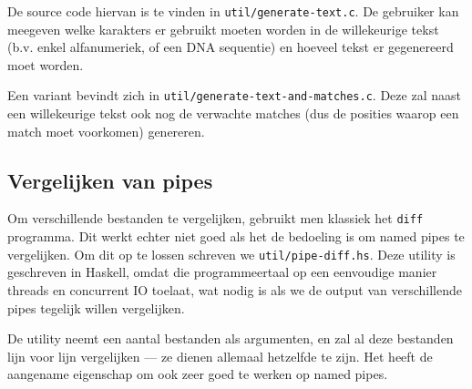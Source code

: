 \documentclass[a4paper,11pt]{article}
\begin{document}
De source code hiervan is te vinden in \verb#util/generate-text.c#. De gebruiker
kan meegeven welke karakters er gebruikt moeten worden in de willekeurige tekst
(b.v. enkel alfanumeriek, of een DNA sequentie) en hoeveel tekst er gegenereerd
moet worden.

\label{generate-text-and-matches}
Een variant bevindt zich in \verb#util/generate-text-and-matches.c#. Deze zal
naast een willekeurige tekst ook nog de verwachte matches (dus de posities
waarop een match moet voorkomen) genereren.

\subsection{Vergelijken van pipes}
\label{pipe-diff}

Om verschillende bestanden te vergelijken, gebruikt men klassiek het \verb#diff#
programma. Dit werkt echter niet goed als het de bedoeling is om named pipes
te vergelijken. Om dit op te lossen schreven we \verb#util/pipe-diff.hs#. Deze
utility is geschreven in Haskell, omdat die programmeertaal op een eenvoudige
manier threads en concurrent IO toelaat, wat nodig is als we de output van
verschillende pipes tegelijk willen vergelijken.

De utility neemt een aantal bestanden als argumenten, en zal al deze bestanden
lijn voor lijn vergelijken — ze dienen allemaal hetzelfde te zijn. Het heeft de
aangename eigenschap om ook zeer goed te werken op named pipes.
\end{document}
